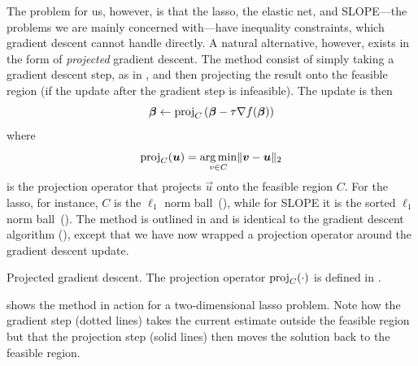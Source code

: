 The problem for us, however, is that the lasso, the elastic net, and SLOPE---the problems we are mainly concerned with---have inequality constraints, which gradient descent cannot handle directly.
A natural alternative, however, exists in the form of \emph{projected} gradient descent. The method consist of simply taking a gradient descent step, as in , and then projecting the result onto the feasible region (if the update after the gradient step is infeasible). The update is then
\[
  \boldsymbol{\beta} \gets \operatorname{proj}_{C}\left(\boldsymbol{\beta} - \tau \nabla f(\boldsymbol{\beta})\right)
\]
where
\begin{equation}
  \label{eq:projection}
  \operatorname{proj}_{C}(\boldsymbol{u}) = \operatorname*{arg\,min}_{v \in C} \lVert \boldsymbol{v} - \boldsymbol{u}\rVert_2
\end{equation}
is the projection operator that projects \(\vec{u}\) onto the feasible region \(C\). For the lasso, for instance, \(C\) is the \(\ell_1\) norm ball~(), while for SLOPE it is the sorted \(\ell_1\) norm ball~(). The method is outlined in  and is identical to the gradient descent algorithm (), except that we have now wrapped a projection operator around the gradient descent update.

\begin{algorithm}
  \caption{Projected gradient descent. The projection operator \(\operatorname{proj}_C(\cdot)\) is defined in .}
  \label{alg:projected-gradient-descent}
\end{algorithm}

 shows the method in action for a two-dimensional lasso problem. Note how the gradient step (dotted lines) takes the current estimate outside the feasible region but that the projection step (solid lines) then moves the solution back to the feasible region.

